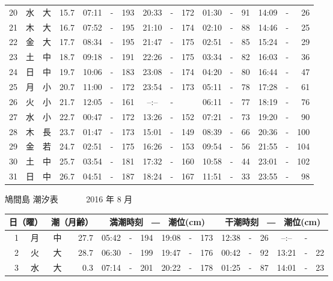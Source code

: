 \documentclass[12pt.a4j]{jsarticle}
\begin{document}
\begin{center}
\begin{table}[ht]
\begin{tabular}{|rc|cr|ccrccr|ccrccr|}
20 & 水 & 大 & 15.7 &  07:11 &-& 193  &  20:33 &-& 172  &   01:30 &-&  91  &   14:09 &-&  26  \\
21 & 木 & 大 & 16.7 &  07:52 &-& 195  &  21:10 &-& 174  &   02:10 &-&  88  &   14:46 &-&  25  \\
22 & 金 & 大 & 17.7 &  08:34 &-& 195  &  21:47 &-& 175  &   02:51 &-&  85  &   15:24 &-&  29  \\
23 & 土 & 中 & 18.7 &  09:18 &-& 191  &  22:26 &-& 175  &   03:34 &-&  82  &   16:03 &-&  36  \\
24 & 日 & 中 & 19.7 &  10:06 &-& 183  &  23:08 &-& 174  &   04:20 &-&  80  &   16:44 &-&  47  \\
25 & 月 & 小 & 20.7 &  11:00 &-& 172  &  23:54 &-& 173  &   05:11 &-&  78  &   17:28 &-&  61  \\
26 & 火 & 小 & 21.7 &  12:05 &-& 161  &  --:-- &-&     &   06:11 &-&  77  &   18:19 &-&  76  \\
27 & 水 & 小 & 22.7 &  00:47 &-& 172  &  13:26 &-& 152  &   07:21 &-&  73  &   19:20 &-&  90  \\
28 & 木 & 長 & 23.7 &  01:47 &-& 173  &  15:01 &-& 149  &   08:39 &-&  66  &   20:36 &-& 100  \\
29 & 金 & 若 & 24.7 &  02:51 &-& 175  &  16:26 &-& 153  &   09:54 &-&  56  &   21:55 &-& 104  \\
30 & 土 & 中 & 25.7 &  03:54 &-& 181  &  17:32 &-& 160  &   10:58 &-&  44  &   23:01 &-& 102  \\
31 & 日 & 中 & 26.7 &  04:51 &-& 187  &  18:24 &-& 167  &   11:51 &-&  33  &   23:55 &-&  98  \\
   \hline
   \end{tabular}
\end{table}
\newpage
 {\LARGE 鳩間島  潮汐表　　　}
 {\large 2016 年  8 月}\\
 \begin{table}[ht]
    \begin{tabular}{|rc|cr|ccrccr|ccrccr|}
    \hline
    \multicolumn{2}{|c|}{日（曜）} & \multicolumn{2}{c|}{潮（月齢）} & \multicolumn{6}{c|}{満潮時刻　―　潮位(cm)} & \multicolumn{6}{c|}{干潮時刻　―　潮位(cm)} \\
 \hline
 1 & 月 & 中 & 27.7 &  05:42 &-& 194  &  19:08 &-& 173  &   12:38 &-&  26  &   --:-- &-&     \\
 2 & 火 & 大 & 28.7 &  06:30 &-& 199  &  19:47 &-& 176  &   00:42 &-&  92  &   13:21 &-&  22  \\
 3 & 水 & 大 &  0.3 &  07:14 &-& 201  &  20:22 &-& 178  &   01:25 &-&  87  &   14:01 &-&  23  \\

\end{tabular}
\end{table}
\end{center}
\end{document}

